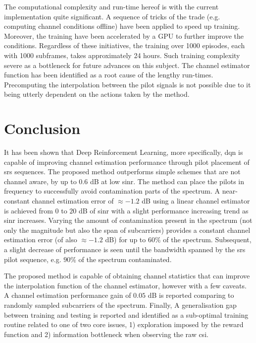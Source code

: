 The computational complexity and run-time hereof is with the current implementation quite significant. A sequence of tricks of the trade (e.g. computing channel conditions offline) have been applied to speed up training. Moreover, the training have been accelerated by a GPU to further improve the conditions. Regardless of these initiatives, the training over 1000 episodes, each with 1000 subframes, takes approximately 24 hours. Such training complexity severe as a bottleneck for future advances on this subject. The channel estimator function has been identified as a root cause of the lengthy run-times. Precomputing the interpolation between the pilot signals is not possible due to it being utterly dependent on the actions taken by the method.



\section{Conclusion}\label{sec:RL_conclusion}
It has been shown that Deep Reinforcement Learning, more specifically, \gls{dqn} is capable of improving channel estimation performance through pilot placement of \gls{srs} sequences. The proposed method outperforms simple schemes that are not channel aware, by up to $0.6$ dB at low \gls{sinr}. The method can place the pilots in frequency to successfully avoid contamination parts of the spectrum. A  near-constant channel estimation error of $\approx -1.2$ dB using a linear channel estimator is achieved from $0$ to $20$ dB of \gls{sinr} with a slight performance increasing trend as \gls{sinr} increases. Varying the amount of contamination present in the spectrum (not only the magnitude but also the span of subcarriers) provides a constant channel estimation error (of also $\approx -1.2$ dB) for up to $60\%$ of the spectrum. Subsequent, a slight decrease of performance is seen until the bandwidth spanned by the \gls{srs} pilot sequence, e.g. $90 \%$ of the spectrum contaminated. 

The proposed method is capable of obtaining channel statistics that can improve the interpolation function of the channel estimator, however with a few caveats. A channel estimation performance gain of $0.05$ dB is reported comparing to randomly sampled subcarriers of the spectrum. Finally, A generalisation gap between training and testing is reported and identified as a sub-optimal training routine related to one of two core issues, 1) exploration imposed by the reward function and 2) information bottleneck when observing the raw \gls{csi}.

